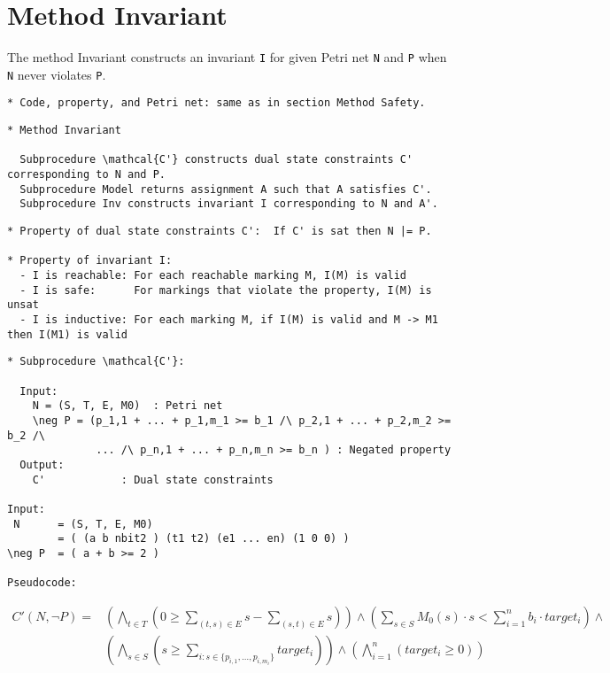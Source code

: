 \section{Method Invariant}

The method Invariant constructs an invariant \verb=I= for given Petri
net \verb=N= and \verb=P= when \verb=N= never violates \verb=P=.

\begin{verbatim}
* Code, property, and Petri net: same as in section Method Safety.
\end{verbatim}

\begin{verbatim}
* Method Invariant

  Subprocedure \mathcal{C'} constructs dual state constraints C' corresponding to N and P.
  Subprocedure Model returns assignment A such that A satisfies C'.
  Subprocedure Inv constructs invariant I corresponding to N and A'.
\end{verbatim}




\begin{verbatim}
* Property of dual state constraints C':  If C' is sat then N |= P.

* Property of invariant I:
  - I is reachable: For each reachable marking M, I(M) is valid
  - I is safe:      For markings that violate the property, I(M) is unsat
  - I is inductive: For each marking M, if I(M) is valid and M -> M1 then I(M1) is valid
\end{verbatim}

\newpage

\begin{verbatim}
* Subprocedure \mathcal{C'}:

  Input:
    N = (S, T, E, M0)  : Petri net
    \neg P = (p_1,1 + ... + p_1,m_1 >= b_1 /\ p_2,1 + ... + p_2,m_2 >= b_2 /\
              ... /\ p_n,1 + ... + p_n,m_n >= b_n ) : Negated property
  Output:
    C'            : Dual state constraints

Input:
 N      = (S, T, E, M0)
        = ( (a b nbit2 ) (t1 t2) (e1 ... en) (1 0 0) )
\neg P  = ( a + b >= 2 )

Pseudocode:
\end{verbatim}

\begin{align*}
  C'(N, \neg P) =& \left( \bigwedge_{t \in T} \left( 0 \ge
                      \sum_{(t, s) \in E} s
                    - \sum_{(s, t) \in E} s \right) \right) \land
     \left( \sum_{s \in S} M_0(s) \cdot s <
       \sum_{i=1}^n b_i \cdot target_i \right) \land \\
     & \left( \bigwedge_{s \in S} \left ( s \ge 
       \sum_{i : s \in \{ p_{i,1}, \ldots, p_{i,m_i} \} } target_i \right) \right) \land
     \left( \bigwedge_{i=1}^n \left( target_i \ge 0 \right) \right)
\end{align*}

